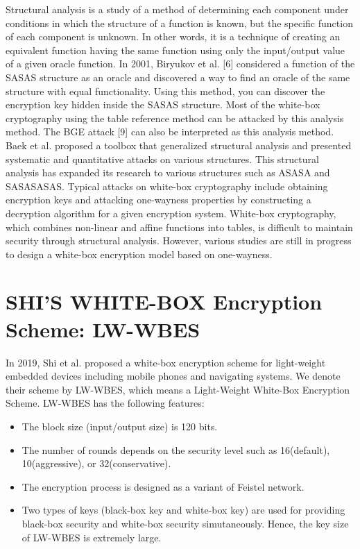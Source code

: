 \documentclass{ieeeaccess}
\begin{document}
Structural analysis is a study of a method of determining each component under conditions in which the structure of a function is known, but the specific function of each component is unknown. In other words, it is a technique of creating an equivalent function having the same function using only the input/output value of a given oracle function. In 2001, Biryukov et al. [6] considered a function of the SASAS structure as an oracle and discovered a way to find an oracle of the same structure with equal functionality. Using this method, you can discover the encryption key hidden inside the SASAS structure. Most of the white-box cryptography using the table reference method can be attacked by this analysis method. The BGE attack [9] can also be interpreted as this analysis method. Baek et al. proposed a toolbox that generalized structural analysis and presented systematic and quantitative attacks on various structures. This structural analysis has expanded its research to various structures such as ASASA and SASASASAS. 
Typical attacks on white-box cryptography include obtaining encryption keys and attacking one-wayness properties by constructing a decryption algorithm for a given encryption system. White-box cryptography, which combines non-linear and affine functions into tables, is difficult to maintain security through structural analysis. However, various studies are still in progress to design a white-box encryption model based on one-wayness. 

\section{SHI'S WHITE-BOX Encryption Scheme: LW-WBES}
In 2019, Shi et al. proposed a white-box encryption scheme
for light-weight embedded devices including mobile phones and navigating systems. 
We denote their scheme by LW-WBES, which means a Light-Weight White-Box Encryption Scheme.
LW-WBES has the following features:
\begin{itemize}
\item The block size (input/output size) is 120 bits. 
\item The number of rounds depends on the security level such as
16(default), 10(aggressive), or 32(conservative).
\item The encryption process is designed as a variant of Feistel network.
\item Two types of keys (black-box key and white-box key) are used for
providing black-box security and white-box security simutaneously. 
Hence, the key size of LW-WBES is extremely large.
\end{itemize}
\end{document}
